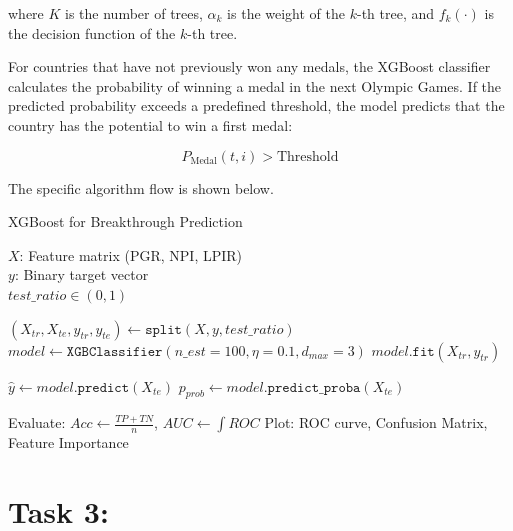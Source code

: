 \documentclass{mcmthesis}
\begin{document}
where \( K \) is the number of trees, \( \alpha_k \) is the weight of the \( k \)-th tree, and \( f_k(\cdot) \) is the decision function of the \( k \)-th tree.


For countries that have not previously won any medals, the XGBoost classifier calculates the probability of winning a medal in the next Olympic Games. If the predicted probability exceeds a predefined threshold, the model predicts that the country has the potential to win a first medal:

\[
P_{\text{Medal}}(t,i) > \text{Threshold}
\]

The specific algorithm flow is shown below.
\begin{algorithm}[H]
	\caption{XGBoost for Breakthrough Prediction}
	\label{alg:xgboost_short}
	\begin{algorithmic}[1]
		\Require 
		$X$: Feature matrix (PGR, NPI, LPIR) \\
		$y$: Binary target vector \\
		$\mathit{test\_ratio} \in (0,1)$
		
		\State $(X_{\mathit{tr}}, X_{\mathit{te}}, y_{\mathit{tr}}, y_{\mathit{te}}) \gets \texttt{split}(X, y, \mathit{test\_ratio})$
		\State $\mathit{model} \gets \texttt{XGBClassifier}(n\_est=100, \eta=0.1, d_{max}=3)$
		\State $\mathit{model}.\texttt{fit}(X_{\mathit{tr}}, y_{\mathit{tr}})$
		
		\State $\hat{y} \gets \mathit{model}.\texttt{predict}(X_{\mathit{te}})$
		\State $p_{\mathit{prob}} \gets \mathit{model}.\texttt{predict\_proba}(X_{\mathit{te}})$
		
		\State Evaluate: $\mathit{Acc} \gets \frac{\mathit{TP+TN}}{n}$, $\mathit{AUC} \gets \int \mathit{ROC}$
		\State Plot: ROC curve, Confusion Matrix, Feature Importance
		\EndProcedure
	\end{algorithmic}
\end{algorithm}

	
	
	
	
	
	
	
	
	
	
	
	
	
	
	
	
	

	
	\section{Task 3:}
	
\end{document}

